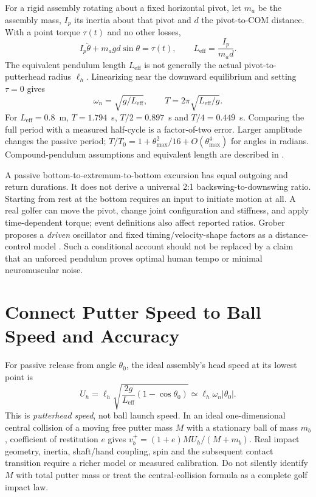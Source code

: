 For a rigid assembly rotating about a fixed horizontal pivot, let $m_a$ be the assembly mass, $I_p$ its inertia about that pivot and $d$ the pivot-to-COM distance. With a point torque $\tau(t)$ and no other losses,
\begin{equation}
I_p\ddot\theta+m_agd\sin\theta=\tau(t),\qquad
L_{\mathrm{eff}}=\frac{I_p}{m_ad}.
\end{equation}
The equivalent pendulum length $L_{\mathrm{eff}}$ is not generally the actual pivot-to-putterhead radius $\ell_h$. Linearizing near the downward equilibrium and setting $\tau=0$ gives
\[
\omega_n=\sqrt{g/L_{\mathrm{eff}}},\qquad
T=2\pi\sqrt{L_{\mathrm{eff}}/g}.
\]
For $L_{\mathrm{eff}}=0.8$~m, $T=1.794$~s, $T/2=0.897$~s and $T/4=0.449$~s. Comparing the full period with a measured half-cycle is a factor-of-two error. Larger amplitude changes the passive period; $T/T_0=1+\theta_{\max}^2/16+O(\theta_{\max}^4)$ for angles in radians. Compound-pendulum assumptions and equivalent length are described in \citet{OpenStaxPendulumReview}.

A passive bottom-to-extremum-to-bottom excursion has equal outgoing and return durations. It does not derive a universal 2:1 backswing-to-downswing ratio. Starting from rest at the bottom requires an input to initiate motion at all. A real golfer can move the pivot, change joint configuration and stiffness, and apply time-dependent torque; event definitions also affect reported ratios. Grober proposes a \emph{driven} oscillator and fixed timing/velocity-shape factors as a distance-control model \cite{Grober2011PuttingReview}. Such a conditional account should not be replaced by a claim that an unforced pendulum proves optimal human tempo or minimal neuromuscular noise.

\section{Connect Putter Speed to Ball Speed and Accuracy}
\label{sec:putting_tempo}

For passive release from angle $\theta_0$, the ideal assembly's head speed at its lowest point is
\begin{equation}
U_h=\ell_h\sqrt{\frac{2g}{L_{\mathrm{eff}}}(1-\cos\theta_0)}
\simeq\ell_h\omega_n|\theta_0|.
\end{equation}
This is \emph{putterhead speed}, not ball launch speed. In an ideal one-dimensional central collision of a moving free putter mass $M$ with a stationary ball of mass $m_b$, coefficient of restitution $e$ gives $v_b^+=(1+e)M U_h/(M+m_b)$. Real impact geometry, inertia, shaft/hand coupling, spin and the subsequent contact transition require a richer model or measured calibration. Do not silently identify $M$ with total putter mass or treat the central-collision formula as a complete golf impact law.

